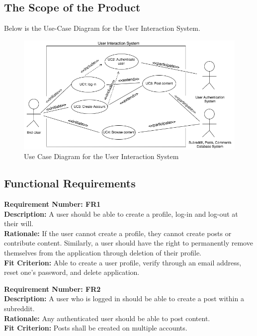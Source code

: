 \documentclass[12pt,fleqn]{article}
\begin{document}
\subsection {The Scope of the Product}
Below is the Use-Case Diagram for the User Interaction System.
\begin{figure}[H]
\centering
\includegraphics[width=16cm]{UseCase}
\caption{Use Case Diagram for the User Interaction System}
\label{fig:use-case}
\end{figure}

\subsection {Functional Requirements}

\begin{tcolorbox}
\textbf{Requirement Number: FR1}\\
\textbf{Description:} A user should be able to create a profile, log-in and log-out at their will.\\
\textbf{Rationale:} If the user cannot create a profile, they cannot create posts or contribute content.  Similarly, a user should have the right to permanently remove themselves from the application through deletion of their profile. \\
\textbf{Fit Criterion:} Able to create a user profile, verify through an email address, reset one's password, and delete application.
\end{tcolorbox}

\begin{tcolorbox}
\textbf{Requirement Number: FR2} \\
\textbf{Description:} A user who is logged in should be able to create a post within a subreddit. \\
\textbf{Rationale:} Any authenticated user should be able to post content. \\
\textbf{Fit Criterion:} Posts shall be created on multiple accounts.
\end{tcolorbox}
\end{document}
